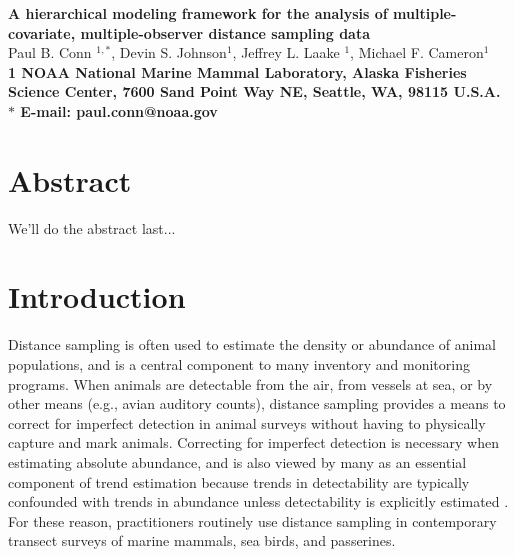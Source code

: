 \documentclass[10pt]{article}
\date{}
\begin{document}
\begin{flushleft}
{\Large
\textbf{A hierarchical modeling framework for the analysis of
multiple-covariate, multiple-observer distance sampling data} }
\\
Paul B. Conn $^{1,\ast}$,
Devin S. Johnson$^{1}$,
Jeffrey L. Laake $^{1}$,
Michael F. Cameron$^{1}$
\\
\bf{1} NOAA National Marine Mammal Laboratory, Alaska Fisheries Science Center,
7600 Sand Point Way NE, Seattle, WA, 98115 U.S.A.
\\
$\ast$ E-mail: paul.conn@noaa.gov
\end{flushleft}

\section*{Abstract}
We'll do the abstract last...


\section*{Introduction}

Distance sampling \cite{BucklandEtAl2001} is often used to estimate the density or abundance of animal populations, and is a central component to many inventory and monitoring programs.  When animals are detectable from the air, from vessels at sea, or by other means (e.g., avian auditory counts), distance sampling provides a means to correct for imperfect detection in animal surveys without having to physically capture and mark animals.  Correcting for imperfect detection is necessary when estimating absolute abundance, and is also viewed by many as an essential component of trend estimation because trends in detectability are typically confounded with trends in abundance unless detectability is explicitly estimated \cite{Buckland2006,NicholsEtAl2009}.  For these reason, practitioners routinely use distance sampling in contemporary transect surveys of marine mammals, sea birds, and passerines.
\end{document}
